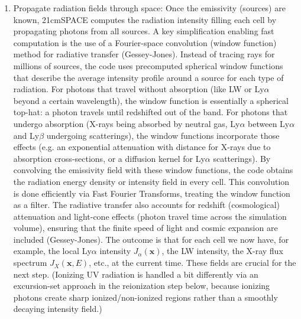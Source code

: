 \documentclass[floats,floatfix,showpacs,amssymb,prd,superscriptaddress,nofootinbib]{revtex4-2} %
\begin{document}
\begin{enumerate}
    \item Propagate radiation fields through space: Once the emissivity (sources) are known, 21cmSPACE computes the radiation intensity filling each cell by propagating photons from all sources. A key simplification enabling fast computation is the use of a Fourier-space convolution (window function) method for radiative transfer (Gessey-Jones). Instead of tracing rays for millions of sources, the code uses precomputed spherical window functions that describe the average intensity profile around a source for each type of radiation. For photons that travel without absorption (like LW or Ly$\alpha$ beyond a certain wavelength), the window function is essentially a spherical top-hat: a photon travels until redshifted out of the band. For photons that undergo absorption (X-rays being absorbed by neutral gas, Ly$\alpha$ between Ly$\alpha$ and Ly$\beta$ undergoing scatterings), the window functions incorporate those effects (e.g. an exponential attenuation with distance for X-rays due to absorption cross-sections, or a diffusion kernel for Ly$\alpha$ scatterings). By convolving the emissivity field with these window functions, the code obtains the radiation energy density or intensity field in every cell. This convolution is done efficiently via Fast Fourier Transforms, treating the window function as a filter. The radiative transfer also accounts for redshift (cosmological) attenuation and light-cone effects (photon travel time across the simulation volume), ensuring that the finite speed of light and cosmic expansion are included (Gessey-Jones). The outcome is that for each cell we now have, for example, the local Ly$\alpha$ intensity $J_{\alpha}(\mathbf{x})$, the LW intensity, the X-ray flux spectrum $J_X(\mathbf{x},E)$, etc., at the current time. These fields are crucial for the next step. (Ionizing UV radiation is handled a bit differently via an excursion-set approach in the reionization step below, because ionizing photons create sharp ionized/non-ionized regions rather than a smoothly decaying intensity field.)


\end{enumerate}
\end{document}
